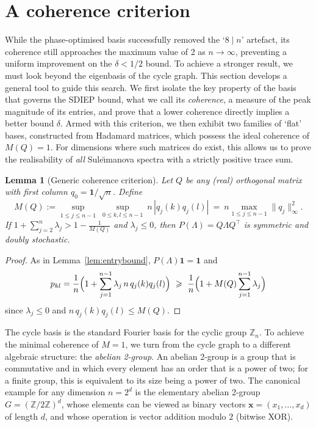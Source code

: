 \documentclass[12pt,fleqn]{amsart}
\renewcommand{\le}{\leqslant}
\renewcommand{\ge}{\geqslant}
\newtheorem{lem}[thm]{Lemma}
\theoremstyle{remark}
\newcommand{\1}{\mathbf{1}}
\newcommand{\Lam}{\Lambda}
\begin{document}
\section{A coherence criterion}

While the phase-optimised basis successfully removed the `$8 \mid n$' artefact, its coherence still approaches the maximum value of 2 as $n \to \infty$, preventing a uniform improvement on the $\delta < 1/2$ bound. To achieve a stronger result, we must look beyond the eigenbasis of the cycle graph. This section develops a general tool to guide this search. We first isolate the key property of the basis that governs the SDIEP bound, what we call its \emph{coherence}, a measure of the peak magnitude of its entries, and prove that a lower coherence directly implies a better bound $\delta$. Armed with this criterion, we then exhibit two families of `flat' bases, constructed from Hadamard matrices, which possess the ideal coherence of $M(Q)=1$. For dimensions where such matrices do exist, this allows us to prove the realisability of \emph{all} Sule\u{\i}manova spectra with a strictly positive trace sum.

\begin{lem}[Generic coherence criterion]\label{lem:coh}
Let $Q$ be any (real) orthogonal matrix with first column $q_0=\1/\sqrt n$. Define
\[
M(Q):=\sup_{1\le j\le n-1}\ \sup_{0\le k,l\le n-1}\ n\,|q_j(k)q_j(l)|
\ =\ n\max_{1\le j\le n-1}\|q_j\|_\infty^2.
\]
If $1+\sum_{j=2}^n\lambda_j>1-\tfrac1{M(Q)}$ and $\lambda_j\le0$, then $P(\Lam)=Q\Lam Q^\top$ is symmetric and doubly stochastic.
\end{lem}

\begin{proof}
As in Lemma~\ref{lem:entrybound}, $P(\Lam)\1=\1$ and
\[
p_{kl}=\frac1n\Bigl(1+\sum_{j=1}^{n-1}\lambda_j\,n\,q_j(k)q_j(l)\Bigr)
\ \ge\ \frac1n\Bigl(1+M(Q)\sum_{j=1}^{n-1}\lambda_j\Bigr)
\]
since $\lambda_j\le0$ and $n\,q_j(k)q_j(l)\le M(Q)$.
\end{proof}

The cycle basis is the standard Fourier basis for the cyclic group $\mathbb{Z}_n$. To achieve the minimal coherence of $M=1$, we turn from the cycle graph to a different algebraic structure: the \emph{abelian 2-group}. An abelian 2-group is a group that is commutative and in which every element has an order that is a power of two; for a finite group, this is equivalent to its size being a power of two. The canonical example for any dimension $n=2^d$ is the elementary abelian 2-group $G = (\mathbb{Z}/2\mathbb{Z})^d$, whose elements can be viewed as binary vectors $\mathbf{x}=(x_1, \dots, x_d)$ of length $d$, and whose operation is vector addition modulo $2$ (bitwise XOR).
\end{document}

